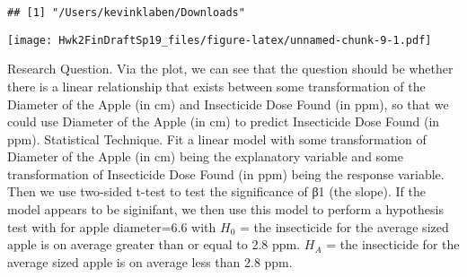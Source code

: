 \documentclass[12pt,]{article}
\newenvironment{Shaded}{\begin{snugshade}}{\end{snugshade}}
\newcommand{\KeywordTok}[1]{\textcolor[rgb]{0.13,0.29,0.53}{\textbf{#1}}}
\newcommand{\DataTypeTok}[1]{\textcolor[rgb]{0.13,0.29,0.53}{#1}}
\newcommand{\DecValTok}[1]{\textcolor[rgb]{0.00,0.00,0.81}{#1}}
\newcommand{\StringTok}[1]{\textcolor[rgb]{0.31,0.60,0.02}{#1}}
\newcommand{\OperatorTok}[1]{\textcolor[rgb]{0.81,0.36,0.00}{\textbf{#1}}}
\newcommand{\NormalTok}[1]{#1}
\begin{document}
\begin{verbatim}
## [1] "/Users/kevinklaben/Downloads"
\end{verbatim}

\begin{Shaded}
\end{Shaded}

\texttt{[image: Hwk2FinDraftSp19\_files/figure-latex/unnamed-chunk-9-1.pdf]}

Research Question. Via the plot, we can see that the question should be
whether there is a linear relationship that exists between some
transformation of the Diameter of the Apple (in cm) and Insecticide Dose
Found (in ppm), so that we could use Diameter of the Apple (in cm) to
predict Insecticide Dose Found (in ppm). Statistical Technique. Fit a
linear model with some transformation of Diameter of the Apple (in cm)
being the explanatory variable and some transformation of Insecticide
Dose Found (in ppm) being the response variable. Then we use two-sided
t-test to test the significance of β1 (the slope). If the model appears
to be siginifant, we then use this model to perform a hypothesis test
with for apple diameter=6.6 with \(H_0\) = the insecticide for the
average sized apple is on average greater than or equal to 2.8 ppm.
\(H_A\) = the insecticide for the average sized apple is on average less
than 2.8 ppm.

\begin{Shaded}
\end{Shaded}
\end{document}
